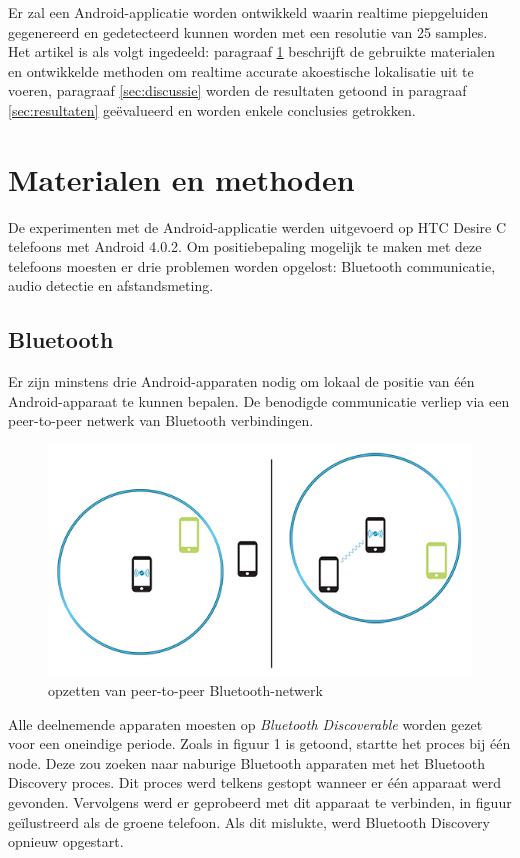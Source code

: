 \documentclass[12pt]{article}
\begin{document}
Er zal een Android-applicatie worden ontwikkeld waarin realtime piepgeluiden gegenereerd en gedetecteerd kunnen worden met een resolutie van 25 samples. Het artikel is als volgt ingedeeld: paragraaf \ref{sec:materialen} beschrijft de gebruikte materialen en ontwikkelde methoden om realtime accurate akoestische lokalisatie uit te voeren, paragraaf \ref{sec:discussie} worden de resultaten getoond in paragraaf \ref{sec:resultaten} ge\"evalueerd en worden enkele conclusies getrokken.

\section{Materialen en methoden}
\label{sec:materialen}
De experimenten met de Android-applicatie werden uitgevoerd op HTC Desire C telefoons met Android 4.0.2. Om positiebepaling mogelijk te maken met deze telefoons moesten er drie problemen worden opgelost: Bluetooth communicatie, audio detectie en afstandsmeting.

\subsection{Bluetooth}
Er zijn minstens drie Android-apparaten nodig om lokaal de positie van \'e\'en Android-apparaat te kunnen bepalen. De benodigde communicatie verliep via een peer-to-peer \cite{schollmeier2001definition} netwerk van Bluetooth \cite{haartsen2000bluetooth} verbindingen.

\begin{figure}[h]
\centering
\includegraphics[scale=0.5]{bluetooth}
\caption{opzetten van peer-to-peer Bluetooth-netwerk}
\end{figure}
Alle deelnemende apparaten moesten op \textit{Bluetooth Discoverable} worden gezet voor een oneindige periode. Zoals in figuur 1 is getoond, startte het proces bij \'e\'en node. Deze zou zoeken naar naburige Bluetooth apparaten met het Bluetooth Discovery proces. Dit proces werd telkens gestopt wanneer er \'e\'en apparaat werd gevonden. Vervolgens werd er geprobeerd met dit apparaat te verbinden, in figuur ge\"ilustreerd als de groene telefoon. Als dit mislukte, werd Bluetooth Discovery opnieuw opgestart.
\end{document}
